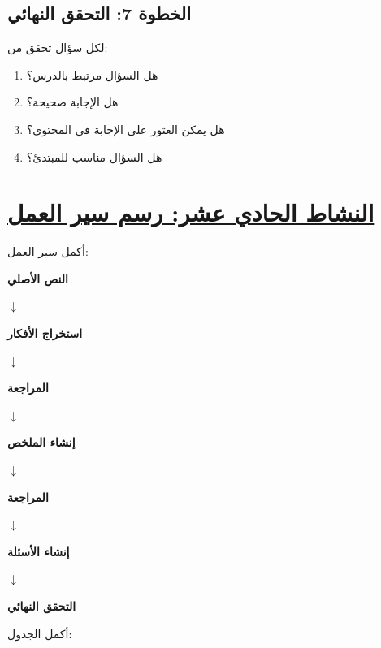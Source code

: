 \documentclass[a4paper]{article}
\begin{document}

\subsection*{\khatt الخطوة 7: التحقق النهائي}

لكل سؤال تحقق من:

\begin{enumerate}

    \item هل السؤال مرتبط بالدرس؟

    \item هل الإجابة صحيحة؟

    \item هل يمكن العثور على الإجابة في المحتوى؟

    \item هل السؤال مناسب للمبتدئ؟

\end{enumerate}



\section*{\khatt\underline{النشاط الحادي عشر: رسم سير العمل}}

أكمل سير العمل:

\begin{center}

\textbf{النص الأصلي}

$\downarrow$

\textbf{استخراج الأفكار}

$\downarrow$

\textbf{المراجعة}

$\downarrow$

\textbf{إنشاء الملخص}

$\downarrow$

\textbf{المراجعة}

$\downarrow$

\textbf{إنشاء الأسئلة}

$\downarrow$

\textbf{التحقق النهائي}

\end{center}

أكمل الجدول:
\end{document}
